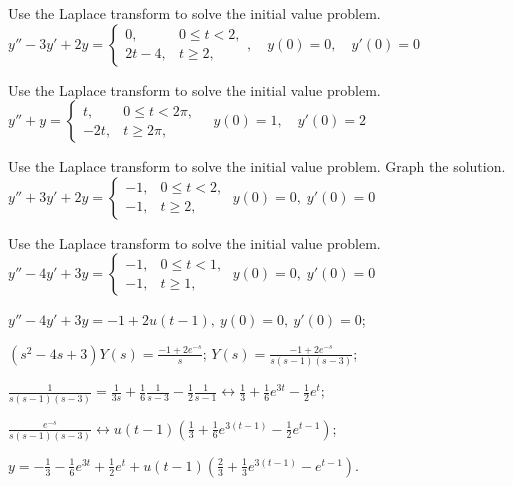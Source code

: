 \documentclass{ximera}
\begin{document}
\begin{problem}\label{exer:8.5.11} Use the Laplace transform to solve the initial value problem.
$y''-3y'+2y=\left\{\begin{array}{cl} 0,&0\le
t<2,\\2t-4,&t\ge 2,\end{array}\right. ,\quad y(0)=0,\quad y'(0)=0$
\end{problem}

\begin{problem}\label{exer:8.5.12} Use the Laplace transform to solve the initial value problem.
$y''+y=\left\{\begin{array}{cl} t,&0\le
t<2\pi,\\-2t,&t\ge 2\pi,\end{array}\right.\quad y(0)=1,\quad y'(0)=2$
\end{problem}

\begin{problem}\label{exer:8.5.13} Use the Laplace transform to solve the initial value problem.  Graph the solution.
$y''+3y'+2y=\left\{\begin{array}{cl}-1,&0\le
t<2,\\-1,&t\ge 2,\end{array}\right.\;  y(0)=0,\;  y'(0)=0$
\end{problem}

\begin{problem}\label{exer:8.5.14} Use the Laplace transform to solve the initial value problem.
$y''-4y'+3y=\left\{\begin{array}{cl}-1,&0\le
t<1,\\-1,&t\ge 1,\end{array}\right.\;  y(0)=0,\;  y'(0)=0$

\begin{solution}
$y''-4y'+3y=-1+2u(t-1),\ y(0)=0,\ y'(0)=0$;

$(s^2-4s+3)Y(s)=\frac{-1+2e^{-s}}{s}$;
$Y(s)=\frac{-1+2e^{-s}}{s(s-1)(s-3)}$;

$\frac{1}{s(s-1)(s-3)}=\frac{1}{3s}+\frac{1}{6}\frac{1}{s-3}-\frac{1}{2}\frac{1}{s-1}
\leftrightarrow \frac{1}{3}+\frac{1}{6}e^{3t}-\frac{1}{2}e^t$;

$\frac{e^{-s}}{s(s-1)(s-3)}
\leftrightarrow u(t-1)\left(
\frac{1}{3}+\frac{1}{6}e^{3(t-1)}-\frac{1}{2}e^{t-1}\right)$;

$y=-\frac{1}{3}-\frac{1}{6}e^{3t}
+\frac{1}{2}e^t+u(t-1)\left(\frac{2}{3}+\frac{1}{3}e^{3(t-1)}
-e^{t-1}\right)$.
\end{solution}
\end{problem}
\end{document}
